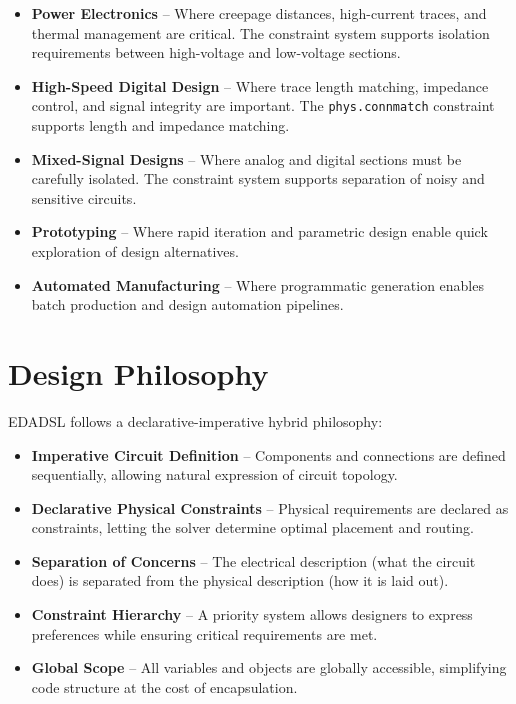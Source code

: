 \begin{itemize}
\item \textbf{Power Electronics} -- Where creepage distances, high-current traces, and thermal management are critical. The constraint system supports isolation requirements between high-voltage and low-voltage sections.

\item \textbf{High-Speed Digital Design} -- Where trace length matching, impedance control, and signal integrity are important. The \texttt{phys.connmatch} constraint supports length and impedance matching.

\item \textbf{Mixed-Signal Designs} -- Where analog and digital sections must be carefully isolated. The constraint system supports separation of noisy and sensitive circuits.

\item \textbf{Prototyping} -- Where rapid iteration and parametric design enable quick exploration of design alternatives.

\item \textbf{Automated Manufacturing} -- Where programmatic generation enables batch production and design automation pipelines.
\end{itemize}

\section{Design Philosophy}
EDADSL follows a declarative-imperative hybrid philosophy:

\begin{itemize}
\item \textbf{Imperative Circuit Definition} -- Components and connections are defined sequentially, allowing natural expression of circuit topology.

\item \textbf{Declarative Physical Constraints} -- Physical requirements are declared as constraints, letting the solver determine optimal placement and routing.

\item \textbf{Separation of Concerns} -- The electrical description (what the circuit does) is separated from the physical description (how it is laid out).

\item \textbf{Constraint Hierarchy} -- A priority system allows designers to express preferences while ensuring critical requirements are met.

\item \textbf{Global Scope} -- All variables and objects are globally accessible, simplifying code structure at the cost of encapsulation.
\end{itemize}

